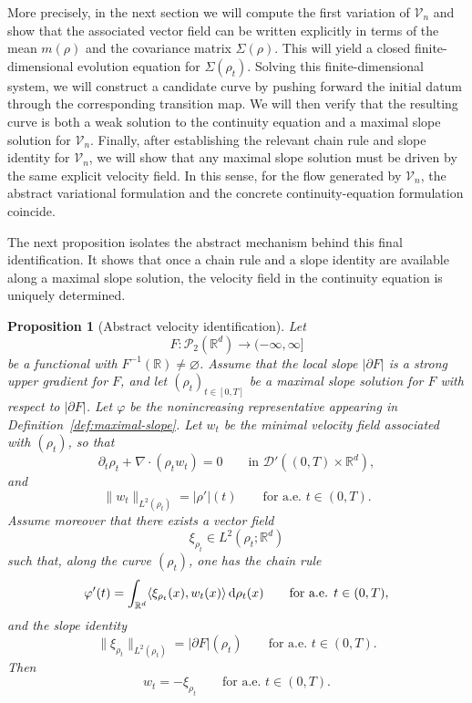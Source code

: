 \documentclass[11pt,reqno]{amsart}
\numberwithin{figure}{section}
\def\d {{\partial}}
\def\d{\mathrm{d}}
\renewcommand{\d}{  {\textup{d}} }
\newtheorem{proposition}{Proposition}[section]
\begin{document}
More precisely, in the next section we will compute the first variation of $\mathcal V_n$ and show that the associated vector field can be written explicitly in terms of the mean $m(\rho)$ and the covariance matrix $\Sigma(\rho)$. This will yield a closed finite-dimensional evolution equation for $\Sigma(\rho_t)$. Solving this finite-dimensional system, we will construct a candidate curve by pushing forward the initial datum through the corresponding transition map. We will then verify that the resulting curve is both a weak solution to the continuity equation and a maximal slope solution for $\mathcal V_n$. Finally, after establishing the relevant chain rule and slope identity for $\mathcal V_n$, we will show that any maximal slope solution must be driven by the same explicit velocity field. In this sense, for the flow generated by $\mathcal V_n$, the abstract variational formulation and the concrete continuity-equation formulation coincide.

The next proposition isolates the abstract mechanism behind this final identification. It shows that once a chain rule and a slope identity are available along a maximal slope solution, the velocity field in the continuity equation is uniquely determined.


\begin{proposition}[Abstract velocity identification] \label{prop:abstract-identification} 
Let 
\[ F:\mathcal P_2(\mathbb R^d)\to(-\infty,\infty] \] 
be a functional with $F^{-1}(\mathbb R)\neq\varnothing$. Assume that the local slope $|\partial F|$ is a strong upper gradient for $F$, and let $(\rho_t)_{t\in[0,T]}$ be a maximal slope solution for $F$ with respect to $|\partial F|$. Let $\varphi$ be the nonincreasing representative appearing in Definition~\ref{def:maximal-slope}. Let $w_t$ be the minimal velocity field associated with $(\rho_t)$, so that 
\[ \partial_t\rho_t+\nabla\cdot(\rho_t w_t)=0 \qquad\text{in }\mathcal D'((0,T)\times\mathbb R^d), \] 
and 
\[ \|w_t\|_{L^2(\rho_t)}=|\rho'|(t) \qquad\text{for a.e. }t\in(0,T). \] 
Assume moreover that there exists a vector field 
\[ \xi_{\rho_t}\in L^2(\rho_t;\mathbb R^d) \] 
such that, along the curve $(\rho_t)$, one has the chain rule 
\[ \varphi'(t) = \int_{\mathbb R^d} \langle \xi_{\rho_t}(x),w_t(x)\rangle\,\d\rho_t(x) \qquad\text{for a.e. }t\in(0,T), \]
and the slope identity 
\[ \|\xi_{\rho_t}\|_{L^2(\rho_t)}=|\partial F|(\rho_t) \qquad\text{for a.e. }t\in(0,T). \] 
Then \[ w_t=-\xi_{\rho_t} \qquad\text{for a.e. }t\in(0,T). \] \end{proposition}
\end{document}
